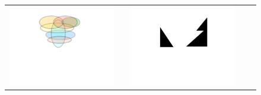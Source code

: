   \begin{figure}[htb]
 \begin{tabular}{clclc}
\begin{minipage}{0.30\textwidth}
 \includegraphics[width=\linewidth, trim=250  320 320 90,clip]{diagrams/Suff.pdf}
\end{minipage}
 & & 
\begin{minipage}{0.30\textwidth}
 \includegraphics[width=\linewidth, trim=250  320 320 90,clip]{diagrams/Nec.pdf}
\end{minipage}
 & &
\begin{minipage}{0.30\textwidth}

\end{minipage}
\end{tabular}
\end{figure}
